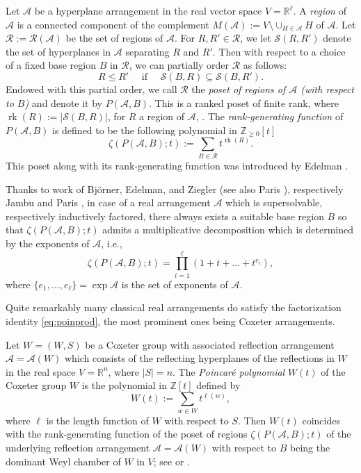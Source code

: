 \documentclass[12pt]{amsart}
\newcommand\CA{{\mathscr A}}
\newcommand\CS{{\mathcal S}}
\newcommand\RR{{\mathscr R}}
\newcommand\BBR{{\mathbb R}}
\newcommand\BBZ{{\mathbb Z}}
\newcommand\rk{\operatorname{rk}}
\numberwithin{equation}{section}
\theoremstyle{plain}
\theoremstyle{definition}
\begin{document}
Let $\CA$ be a 
hyperplane arrangement in the real vector space $V=\BBR^\ell$. 
A \emph{region} of $\CA$ is a connected component of the 
complement $M(\CA) := V \setminus \cup_{H \in \CA}H$ of $\CA$.
Let $\RR := \RR(\CA)$ be the set of regions of $\CA$.
For $R, R' \in \RR$, we let $\CS(R,R')$ denote the 
set of hyperplanes in $\CA$ separating $R$ and $R'$.
Then with respect to a choice of a fixed 
base region $B$ in $\RR$, we can partially order
$\RR$ as follows:
\[
R \le R' \quad \text{ if } \quad \CS(B,R) \subseteq \CS(B,R').
\]
Endowed with this partial order, we call $\RR$ the
\emph{poset of regions of $\CA$ (with respect to $B$)} and denote it by
$P(\CA, B)$. This is a ranked poset of finite rank,
where $\rk(R) := |\CS(B,R)|$, for $R$ a region of $\CA$, 
\cite[Prop.\ 1.1]{edelman:regions}.
The \emph{rank-generating function} of $P(\CA, B)$ is 
defined to be the following polynomial in 
$\BBZ_{\ge 0}[t]$
\begin{equation*}
	\label{eq:rankgen}
	\zeta(P(\CA,B); t) := \sum_{R \in \RR}t^{\rk(R)}. 
\end{equation*}
This poset along with its rank-generating function
was introduced by Edelman 
\cite{edelman:regions}.



Thanks to work of  Bj\"orner, Edelman, and Ziegler 
\cite[Thm.~4.4]{bjoerneredelmanziegler}
(see also Paris \cite{paris:counting}), respectively  
Jambu and Paris \cite[Prop.~3.4, Thm.~6.1]{jambuparis:factored},
in case of a real arrangement $\CA$  
which is supersolvable, 
respectively inductively factored, 
there always exists a suitable base region $B$ so that 
$\zeta(P(\CA,B); t)$
admits a multiplicative decomposition which 
is determined by the exponents of $\CA$, i.e.,
\begin{equation}
	\label{eq:poinprod}
	\zeta(P(\CA,B); t) = \prod_{i=1}^\ell (1 + t + \ldots + t^{e_i}),
\end{equation}
where $\{e_1, \ldots, e_\ell\} = \exp \CA$ is the 
set of exponents of $\CA$.

Quite remarkably
many classical real arrangements do satisfy the
factorization identity \eqref{eq:poinprod}, 
the most prominent ones being Coxeter arrangements.

Let $W = (W,S)$ be a Coxeter group with associated reflection arrangement 
$\CA = \CA(W)$ which consists of the reflecting hyperplanes of 
the reflections in $W$ in the real space $V=\BBR^n$, where $|S| = n$. 
The 
\emph{Poincar\'e polynomial} $W(t)$ of 
the Coxeter group $W$ is the polynomial in $\BBZ[t]$ defined by 
\begin{equation}
	\label{eq:poncarecoxeter}
	W(t) := \sum_{w \in W} t^{\ell(w)},
\end{equation}
where $\ell$ is the length function 
of $W$ with respect to $S$.
Then $W(t)$
coincides with the rank-generating function of the poset of regions $\zeta(P(\CA,B); t)$ of 
the underlying reflection arrangement 
$\CA = \CA(W)$ with respect to $B$ being the dominant Weyl chamber of $W$ in $V$; 
see \cite{bjoerneredelmanziegler} or \cite{jambuparis:factored}.
\end{document}
